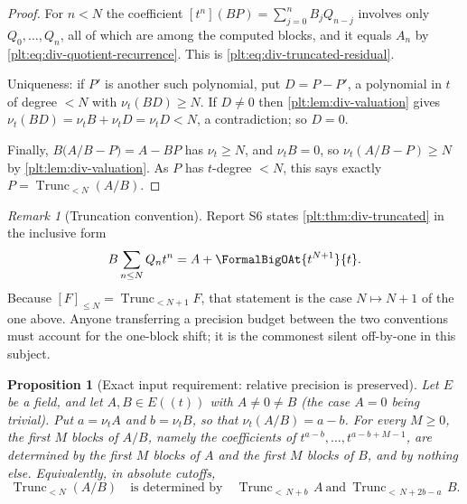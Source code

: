 \documentclass[11pt,oneside]{article}
\theoremstyle{plain}
\newtheorem{proposition}[theorem]{Proposition}
\theoremstyle{definition}
\theoremstyle{remark}
\newtheorem{remark}[theorem]{Remark}
\newcommand{\ordt}{\nu_{t}}                              %
\newcommand{\Trunc}[2]{\operatorname{Trunc}_{<#2}#1}     %
\begin{document}
\begin{proof}
For \(n<N\) the coefficient \([t^{n}](BP)=\sum_{j=0}^{n}B_{j}Q_{n-j}\) involves
only \(Q_{0},\dots,Q_{n}\), all of which are among the computed blocks, and it
equals \(A_{n}\) by \cref{plt:eq:div-quotient-recurrence}.  This is
\cref{plt:eq:div-truncated-residual}.

Uniqueness: if \(P'\) is another such polynomial, put \(D=P-P'\), a polynomial
in \(t\) of degree \(<N\) with \(\ordt(BD)\ge N\).  If \(D\ne0\) then
\cref{plt:lem:div-valuation} gives \(\ordt(BD)=\ordt B+\ordt D=\ordt D<N\), a
contradiction; so \(D=0\).

Finally, \(B\bigl(A/B-P\bigr)=A-BP\) has \(\ordt\ge N\), and \(\ordt B=0\), so
\(\ordt(A/B-P)\ge N\) by \cref{plt:lem:div-valuation}.  As \(P\) has
\(t\)-degree \(<N\), this says exactly \(P=\Trunc{(A/B)}{N}\).
\end{proof}

\begin{remark}[Truncation convention]\label{plt:rmk:div-truncation-convention}
Report S6 states \cref{plt:thm:div-truncated} in the inclusive form
\[
  B\sum_{n\le N}Q_{n}t^{n}=A+\FormalBigOAt{t^{N+1}}{t}.
\]
Because \([F]_{\le N}=\Trunc{F}{N+1}\), that statement is the case
\(N\mapsto N+1\) of the one above.  Anyone transferring a precision budget
between the two
conventions must account for the one-block shift; it is the commonest silent
off-by-one in this subject.
\end{remark}

\begin{proposition}[Exact input requirement: relative precision is preserved]
\label{plt:prop:div-relative-precision}
Let \(E\) be a field, and let \(A,B\in E((t))\) with \(A\ne0\ne B\) (the case
\(A=0\) being trivial).  Put \(a=\ordt A\) and \(b=\ordt B\), so that
\(\ordt(A/B)=a-b\).  For every \(M\ge0\), the first \(M\) blocks of \(A/B\),
namely the coefficients of \(t^{a-b},\dots,t^{a-b+M-1}\), are determined by the
first \(M\) blocks of \(A\) and the first \(M\) blocks of \(B\), and by nothing
else.  Equivalently, in absolute cutoffs,
\begin{equation}\label{plt:eq:div-guard}
  \Trunc{(A/B)}{N}
  \quad\text{is determined by}\quad
  \Trunc{A}{\,N+b\,}
  \ \text{and}\
  \Trunc{B}{\,N+2b-a\,}.
\end{equation}
\end{proposition}
\end{document}

